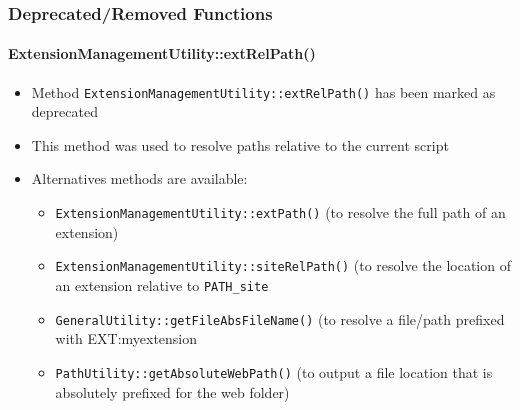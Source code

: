 \begin{frame}[fragile]
	\frametitle{Deprecated/Removed Functions}
	\framesubtitle{ExtensionManagementUtility::extRelPath()}

	\begin{itemize}

		\item Method \texttt{ExtensionManagementUtility::extRelPath()} has been marked as deprecated
		\item This method was used to resolve paths relative to the current script
		\item Alternatives methods are available:

			\begin{itemize}
				\item \texttt{ExtensionManagementUtility::extPath()}\newline
					(to resolve the full path of an extension)
				\item \texttt{ExtensionManagementUtility::siteRelPath()}\newline
					(to resolve the location of an extension relative to \texttt{PATH\_site}
				\item \texttt{GeneralUtility::getFileAbsFileName()}\newline
					(to resolve a file/path prefixed with EXT:myextension
				\item \texttt{PathUtility::getAbsoluteWebPath()}\newline
					(to output a file location that is absolutely prefixed for the web folder)
			\end{itemize}

	\end{itemize}

\end{frame}


